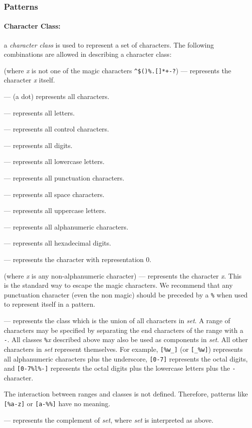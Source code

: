 \documentclass[11pt,twoside,draft]{article}
\newcommand{\M}[1]{{\rm\emph{#1}}}
\newcommand{\T}[1]{{\tt #1}}
\newcommand{\Def}[1]{\emph{#1}\index{#1}}
\begin{document}
\subsubsection*{Patterns} \label{pm}

\paragraph{Character Class:}
a \Def{character class} is used to represent a set of characters.
The following combinations are allowed in describing a character class:
\begin{description}\leftskip=20pt
\item[\emph{x}] (where \emph{x} is not one of the magic characters
\verb|^$()%.[]*+-?|)
--- represents the character \emph{x} itself.
\item[\T{.}] --- (a dot) represents all characters.
\item[\T{\%a}] --- represents all letters.
\item[\T{\%c}] --- represents all control characters.
\item[\T{\%d}] --- represents all digits.
\item[\T{\%l}] --- represents all lowercase letters.
\item[\T{\%p}] --- represents all punctuation characters.
\item[\T{\%s}] --- represents all space characters.
\item[\T{\%u}] --- represents all uppercase letters.
\item[\T{\%w}] --- represents all alphanumeric characters.
\item[\T{\%x}] --- represents all hexadecimal digits.
\item[\T{\%z}] --- represents the character with representation 0.
\item[\T{\%\M{x}}] (where \M{x} is any non-alphanumeric character)  ---
represents the character \M{x}.
This is the standard way to escape the magic characters.
We recommend that any punctuation character (even the non magic)
should be preceded by a \verb|%|
when used to represent itself in a pattern.

\item[\T{[\M{set}]}] ---
represents the class which is the union of all
characters in \M{set}.
A range of characters may be specified by
separating the end characters of the range with a \verb|-|.
All classes \verb|%|\emph{x} described above may also be used as
components in \M{set}.
All other characters in \M{set} represent themselves.
For example, \verb|[%w_]| (or \verb|[_%w]|)
represents all alphanumeric characters plus the underscore,
\verb|[0-7]| represents the octal digits,
and \verb|[0-7%l%-]| represents the octal digits plus
the lowercase letters plus the \verb|-| character.

The interaction between ranges and classes is not defined.
Therefore, patterns like \verb|[%a-z]| or \verb|[a-%%]|
have no meaning.

\item[\T{[\^\null\M{set}]}] ---
represents the complement of \M{set},
where \M{set} is interpreted as above.
\end{description}
\end{document}

